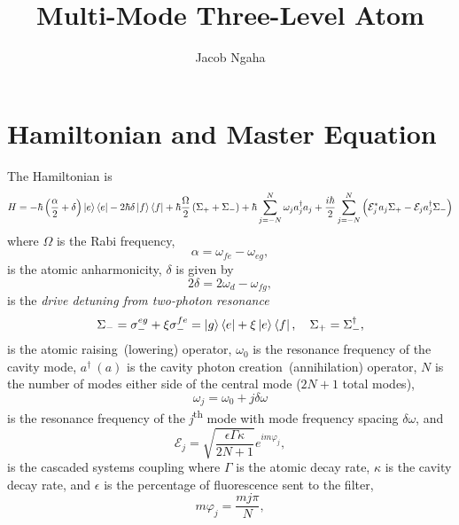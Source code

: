 \documentclass{article}
\title{Multi-Mode Three-Level Atom}
\author{Jacob Ngaha}
\begin{document}
	
\maketitle

\section{Hamiltonian and Master Equation}

The Hamiltonian is
\begin{equation}\label{hamiltonian}
	H = -\hbar \left( \frac{\alpha}{2} + \delta \right) \ket{e}\bra{e} - 2 \hbar \delta \ket{f}\bra{f} + \hbar \frac{\Omega}{2} \left( \Sigma_{+} + \Sigma_{-} \right) + \hbar \sum_{j=-N}^{N} \omega_{j} a^{\dagger}_{j} a_{j} + \frac{i \hbar}{2} \sum_{j=-N}^{N} \left( \mathcal{E}_{j}^{*} a_{j} \Sigma_{+} - \mathcal{E}_{j} a^{\dagger}_{j} \Sigma_{-} \right)
\end{equation}
where $\Omega$ is the Rabi frequency,
\begin{equation}
	\alpha = \omega_{fe} - \omega_{eg},
\end{equation}
is the atomic anharmonicity, $\delta$ is given by
\begin{equation}
	2\delta = 2\omega_{d} - \omega_{fg},
\end{equation}
is the \textit{drive detuning from two-photon resonance}
\begin{equation}
	\Sigma_{-} = \sigma_{-}^{eg} + \xi \sigma_{-}^{fe} = \ket{g}\bra{e} + \xi \ket{e}\bra{f}, \quad \Sigma_{+} = \Sigma_{-}^{\dagger},
\end{equation}
is the atomic raising~(lowering) operator, $\omega_{0}$ is the resonance frequency of the cavity mode, $a^{\dagger}~(a)$ is the cavity photon creation~(annihilation) operator, $N$ is the number of modes either side of the central mode ($2N+1$ total modes), 
\begin{equation}
	\omega_{j} = \omega_{0} + j \delta\omega
\end{equation}
is the resonance frequency of the \textit{j}\textsuperscript{th} mode with mode frequency spacing $\delta\omega$, and
\begin{equation}
	\mathcal{E}_{j} = \sqrt{\frac{\epsilon \Gamma \kappa}{2N + 1}} e^{i m \varphi_{j}},
\end{equation}
is the cascaded systems coupling where $\Gamma$ is the atomic decay rate, $\kappa$ is the cavity decay rate, and $\epsilon$ is the percentage of fluorescence sent to the filter, 
\begin{equation}
	m \varphi_{j} = \frac{m j \pi}{N},
\end{equation}
\end{document}
